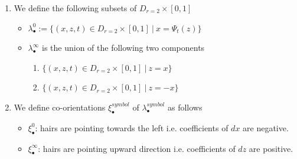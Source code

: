 \begin{definition}
\begin{enumerate}
\item We define the following subsets of $D_{r=2}\times [0,1]$
\begin{itemize}
\item $\lambda_\bullet^0 := \{(x,z,t) \in D_{r=2} \times [0,1] ~|~ x = \Psi_t(z)\}$

\item $\lambda_\bullet^\infty$ is the union of the following two components
\begin{enumerate}[label=(\roman*)]
\item $\{(x,z,t) \in D_{r=2}\times [0,1] ~|~ z = x \}$

\item $\{(x,z,t) \in D_{r=2}\times [0,1] ~|~ z = -x \}$
\end{enumerate}
\end{itemize}

\item We define co-orientations $\xi_\bullet^{symbol}$ of $\lambda_\bullet^{symbol}$ as follows
\begin{itemize}
\item $\xi_\bullet^0$: hairs are pointing towards the left i.e. coefficients of $dx$ are negative.

\item $\xi_\bullet^\infty$: hairs are pointing upward direction i.e. coefficients of $dz$ are positive.
\end{itemize}
\end{enumerate}
\end{definition}

